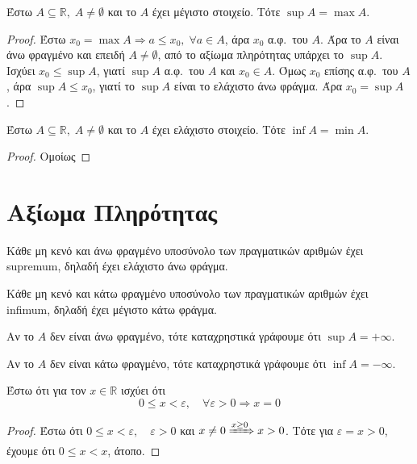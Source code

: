 \documentclass[main.tex]{subfiles}
\begin{document}
\begin{mypropbox}
  Έστω $ A \subseteq \mathbb{R}, \; A \neq \emptyset $ και το $A$ έχει μέγιστο 
  στοιχείο. Τότε $ \sup A = \max A $.
\end{mypropbox}
\begin{proof}
\item {}
  Έστω $ x_{0} = \max A \Rightarrow a \leq x_{0}, \; \forall a \in A $, άρα $ x_{0} $ α.φ.\
  του $A$. Άρα το $A$ είναι άνω φραγμένο και επειδή $ A \neq \emptyset $, από το αξίωμα
  πληρότητας υπάρχει το $ \sup A $. 
  Ισχύει $ x_{0} \leq \sup A $, γιατί $ \sup A $ α.φ.\ του $A$ και $ x_{0} \in A $.
  Όμως $ x_{0} $ επίσης α.φ.\ του $A$, άρα $ \sup A \leq x_{0} $, γιατί το $ \sup A $
  είναι το ελάχιστο άνω φράγμα.
  Άρα $ x_{0}= \sup A $.
\end{proof}

\begin{mypropbox}
  Έστω $ A \subseteq \mathbb{R}, \; A \neq \emptyset $ και το $A$ έχει ελάχιστο
  στοιχείο. Τότε $ \inf A = \min A $.
\end{mypropbox}
\begin{proof}
  Ομοίως 
\end{proof}


\section{Αξίωμα Πληρότητας}

\begin{myitemize}
  \item Κάθε μη κενό και άνω φραγμένο υποσύνολο των πραγματικών αριθμών έχει 
    supremum, δηλαδή έχει ελάχιστο άνω φράγμα.
  \item Κάθε μη κενό και κάτω  φραγμένο υποσύνολο των πραγματικών αριθμών έχει 
    infimum, δηλαδή έχει μέγιστο κάτω φράγμα.
\end{myitemize}

\begin{rem}
\item {}
  \begin{myitemize}
    \item Αν το $A$ δεν είναι άνω φραγμένο, τότε καταχρηστικά  γράφουμε ότι 
      $ \sup A = + \infty $.
    \item Αν το $A$ δεν είναι κάτω φραγμένο, τότε καταχρηστικά  γράφουμε ότι 
      $ \inf A = - \infty $.
  \end{myitemize}
\end{rem}

\begin{mypropbox}
  \label{prop:epsilonprot}
  Έστω ότι για τον $x \in \mathbb{R}$ ισχύει ότι 
  \[
    0 \leq x < \varepsilon, \quad \forall \varepsilon >0 \Rightarrow x =0 
  \]
\end{mypropbox}
\begin{proof}
\item {}
  Έστω ότι $ 0 \leq x < \varepsilon, \quad \varepsilon >0 $ και 
  $ x \neq 0 \xRightarrow{x \geq 0} x > 0$. Τότε για $ \varepsilon = 
  x > 0$, έχουμε ότι $ 0 \leq x < x $, άτοπο.
\end{proof}
\end{document}
